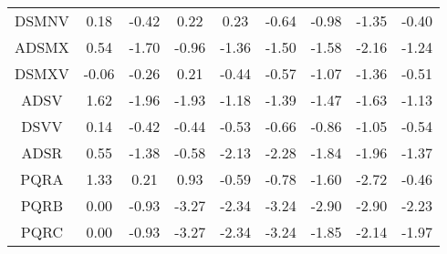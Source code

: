 \documentclass[11pt,a4paper]{report}
\begin{document}
\begin{longtable}{ | c || c | c | c | c | c | c | c || c |}
DSMNV &  \cellcolor[HTML]{F7F7FF} 0.18 &  \cellcolor[HTML]{FFF7F7} -0.42 &  \cellcolor[HTML]{F7F7FF} 0.22 &  \cellcolor[HTML]{F7F7FF} 0.23 &  \cellcolor[HTML]{FFEFEF} -0.64 &  \cellcolor[HTML]{FFE7E7} -0.98 &  \cellcolor[HTML]{FFDFDF} -1.35 &  \cellcolor[HTML]{FFF7F7} -0.40 \\
ADSMX &  \cellcolor[HTML]{EFEFFF} 0.54 &  \cellcolor[HTML]{FFD7D7} -1.70 &  \cellcolor[HTML]{FFE7E7} -0.96 &  \cellcolor[HTML]{FFDFDF} -1.36 &  \cellcolor[HTML]{FFD7D7} -1.50 &  \cellcolor[HTML]{FFD7D7} -1.58 &  \cellcolor[HTML]{FFC7C7} -2.16 &  \cellcolor[HTML]{FFDFDF} -1.24 \\
DSMXV &  \cellcolor[HTML]{FFFFFF} -0.06 &  \cellcolor[HTML]{FFF7F7} -0.26 &  \cellcolor[HTML]{F7F7FF} 0.21 &  \cellcolor[HTML]{FFF7F7} -0.44 &  \cellcolor[HTML]{FFEFEF} -0.57 &  \cellcolor[HTML]{FFE7E7} -1.07 &  \cellcolor[HTML]{FFDFDF} -1.36 &  \cellcolor[HTML]{FFEFEF} -0.51 \\
ADSV &  \cellcolor[HTML]{D7D7FF} 1.62 &  \cellcolor[HTML]{FFCFCF} -1.96 &  \cellcolor[HTML]{FFCFCF} -1.93 &  \cellcolor[HTML]{FFDFDF} -1.18 &  \cellcolor[HTML]{FFDFDF} -1.39 &  \cellcolor[HTML]{FFD7D7} -1.47 &  \cellcolor[HTML]{FFD7D7} -1.63 &  \cellcolor[HTML]{FFDFDF} -1.13 \\
DSVV &  \cellcolor[HTML]{FFFFFF} 0.14 &  \cellcolor[HTML]{FFF7F7} -0.42 &  \cellcolor[HTML]{FFF7F7} -0.44 &  \cellcolor[HTML]{FFEFEF} -0.53 &  \cellcolor[HTML]{FFEFEF} -0.66 &  \cellcolor[HTML]{FFE7E7} -0.86 &  \cellcolor[HTML]{FFE7E7} -1.05 &  \cellcolor[HTML]{FFEFEF} -0.54 \\
ADSR &  \cellcolor[HTML]{EFEFFF} 0.55 &  \cellcolor[HTML]{FFDFDF} -1.38 &  \cellcolor[HTML]{FFEFEF} -0.58 &  \cellcolor[HTML]{FFC7C7} -2.13 &  \cellcolor[HTML]{FFC7C7} -2.28 &  \cellcolor[HTML]{FFCFCF} -1.84 &  \cellcolor[HTML]{FFCFCF} -1.96 &  \cellcolor[HTML]{FFDFDF} -1.37 \\
PQRA &  \cellcolor[HTML]{DFDFFF} 1.33 &  \cellcolor[HTML]{F7F7FF} 0.21 &  \cellcolor[HTML]{E7E7FF} 0.93 &  \cellcolor[HTML]{FFEFEF} -0.59 &  \cellcolor[HTML]{FFEFEF} -0.78 &  \cellcolor[HTML]{FFD7D7} -1.60 &  \cellcolor[HTML]{FFB7B7} -2.72 &  \cellcolor[HTML]{FFF7F7} -0.46 \\
PQRB &  \cellcolor[HTML]{FFFFFF} 0.00 &  \cellcolor[HTML]{FFE7E7} -0.93 &  \cellcolor[HTML]{FFAFAF} -3.27 &  \cellcolor[HTML]{FFC7C7} -2.34 &  \cellcolor[HTML]{FFAFAF} -3.24 &  \cellcolor[HTML]{FFB7B7} -2.90 &  \cellcolor[HTML]{FFB7B7} -2.90 &  \cellcolor[HTML]{FFC7C7} -2.23 \\
PQRC &  \cellcolor[HTML]{FFFFFF} 0.00 &  \cellcolor[HTML]{FFE7E7} -0.93 &  \cellcolor[HTML]{FFAFAF} -3.27 &  \cellcolor[HTML]{FFC7C7} -2.34 &  \cellcolor[HTML]{FFAFAF} -3.24 &  \cellcolor[HTML]{FFCFCF} -1.85 &  \cellcolor[HTML]{FFC7C7} -2.14 &  \cellcolor[HTML]{FFCFCF} -1.97 \\

\end{longtable}
\end{document}
